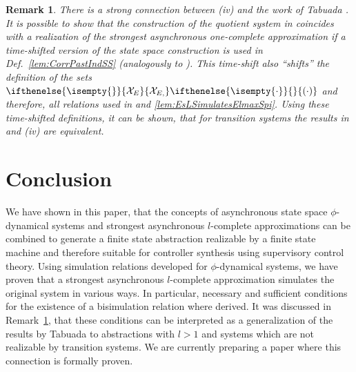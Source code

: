 \documentclass[letterpaper, 11 pt, onecolumn]{ieeeconf}
\newtheorem{remark}{Remark}
\newcommand{\REFlem}[1]{\text{Lemma~\ref{#1}}}
\newcommand{\REFthm}[1]{\text{Thm.~\ref{#1}}}
\newcommand{\REFdef}[1]{Def.~\ref{#1}}
\newcommand{\0}{\ensuremath{\emptyset}}
\newcommand{\Xx}[2]{\ensuremath{\ifthenelse{\isempty{#1}}{\mathcal{X}_{E}}{\mathcal{X}_{E,#1}}\ifthenelse{\isempty{#2}}{}{(#2)}}}
\newcommand{\signalmap}{\phi}
\begin{document}
\begin{remark}\label{rem:ConnectionTabuada}
 There is a strong connection between \REFthm{thm:EqRel_PISS} (iv) 
 and the work of Tabuada \cite[Thm. 4.18]{TabuadaBook}. 
  It is possible to show that the construction of 
 the quotient system in \cite[Def.4.17]{TabuadaBook} coincides with a realization of the strongest asynchronous one-complete 
 approximation if a time-shifted version of the state space construction is used in \REFdef{lem:CorrPastIndSS} (analogously to \cite[Sec. 4]{Raisch2010}).
  This time-shift also \enquote{shifts} the definition of the sets $\Xx{}{\cdot}$ and therefore, all relations used in \REFlem{lem:ElmaxSpiSimulatesEs} and \ref{lem:EsLSimulatesElmaxSpi}. 
Using these time-shifted definitions, it can be shown, that for transition systems the results in \cite[Thm. 4.18]{TabuadaBook} and \REFthm{thm:EqRel_PISS} (iv) are equivalent.
\end{remark}


\section{Conclusion}\label{sec:conclusion}
We have shown in this paper, that the concepts of asynchronous state space $\signalmap$-dynamical systems and strongest asynchronous $l$-complete approximations can be combined to generate a finite state abstraction realizable by a finite state machine and therefore suitable for controller synthesis using supervisory control theory. Using simulation relations developed for $\signalmap$-dynamical systems, 
we have proven that a strongest asynchronous $l$-complete approximation simulates the original system in various ways. 
 In particular, necessary and sufficient conditions for the existence of a bisimulation relation where derived. It was discussed in Remark~\ref{rem:ConnectionTabuada}, that these conditions can be interpreted as a generalization of the results by Tabuada \cite[Thm. 4.18]{TabuadaBook} to abstractions with $l>1$ and systems which are not realizable by transition systems. We are currently preparing a paper where this connection is formally proven.
\end{document}
